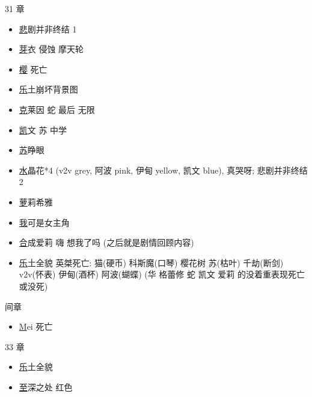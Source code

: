 \documentclass[a4paper]{article}
\begin{document}
31 章

\begin{itemize}
    \item \href{https://www.bilibili.com/video/BV1r94y1D7Ze/} 悲剧并非终结 1
    \item \href{https://www.bilibili.com/video/BV1r94y1D7Ze/?t=1566} 芽衣 侵蚀 摩天轮
    \item \href{https://www.bilibili.com/video/BV1r94y1D7Ze/?p=2&t=2571} 樱 死亡
    \item \href{https://www.bilibili.com/video/BV1r94y1D7Ze/?p=3&t=915} 乐土崩坏背景图
    \item \href{https://www.bilibili.com/video/BV1r94y1D7Ze/?p=4&t=1729} 克莱因 蛇 最后 无限
    \item \href{https://www.bilibili.com/video/BV1r94y1D7Ze/?p=4&t=2803} 凯文 苏 中学
    \item \href{https://www.bilibili.com/video/BV1r94y1D7Ze/?p=4&t=3865} 苏睁眼
    \item \href{https://www.bilibili.com/video/BV1r94y1D7Ze/?p=5&t=1865} 水晶花*4 (v2v grey, 阿波 pink, 伊甸 yellow, 凯文 blue), 真哭呀; 悲剧并非终结 2
    \item \href{https://www.bilibili.com/video/BV1r94y1D7Ze/?p=6&t=728} 萝莉希雅
    \item \href{https://www.bilibili.com/video/BV1r94y1D7Ze/?p=7&t=900} 我可是女主角
    \item \href{https://www.bilibili.com/video/BV1r94y1D7Ze/?p=7&t=1200} 合成爱莉 嗨 想我了吗 (之后就是剧情回顾内容)
    \item \href{https://www.bilibili.com/video/BV1r94y1D7Ze/?p=7&t=3850} 乐土全貌 英桀死亡: 猫(硬币) 科斯魔(口琴) 樱花树 苏(枯叶) 千劫(断剑) v2v(怀表) 伊甸(酒杯) 阿波(蝴蝶) (华 格蕾修 蛇 凯文 爱莉 的没着重表现死亡或没死)
\end{itemize}

间章

\begin{itemize}
    \item \href{https://www.bilibili.com/video/BV17U4y1r7kn/?p=2&t=239} Mei 死亡
\end{itemize}

33 章

\begin{itemize}
    \item \href{https://www.bilibili.com/video/BV1ZG4y1o7ie/?p=2&t=3333} 乐土全貌
    \item \href{https://www.bilibili.com/video/BV1ZG4y1o7ie/?p=2&t=3647} 至深之处 红色
\end{itemize}
\end{document}

